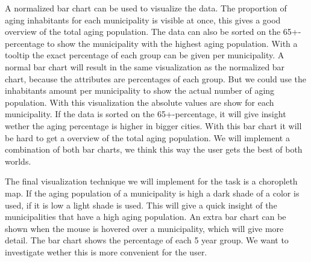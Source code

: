 A normalized bar chart can be used to visualize the data.
The proportion of aging inhabitants for each municipality is visible at once, this gives a good overview of the total aging population.
The data can also be sorted on the 65+-percentage to show the municipality with the highest aging population.
With a tooltip the exact percentage of each group can be given per municipality.
A normal bar chart will result in the same visualization as the normalized bar chart, because the attributes are percentages of each group.
But we could use the inhabitants amount per municipality to show the actual number of aging population.
With this visualization the absolute values are show for each municipality.
If the data is sorted on the 65+-percentage, it will give insight wether the aging percentage is higher in bigger cities.
With this bar chart it will be hard to get a overview of the total aging population.
We will implement a combination of both bar charts, we think this way the user gets the best of both worlds.

The final visualization technique we will implement for the task is a choropleth map.
If the aging population of a municipality is high a dark shade of a color is used, if it is low a light shade is used.
This will give a quick insight of the municipalities that have a high aging population.
An extra bar chart can be shown when the mouse is hovered over a municipality, which will give more detail.
The bar chart shows the percentage of each 5 year group.
We want to investigate wether this is more convenient for the user.
